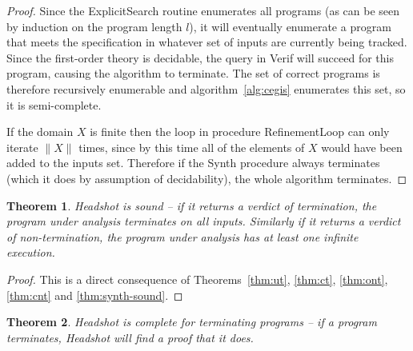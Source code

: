 \documentclass[preprint]{sigplanconf}
\newtheorem{theorem}{Theorem}
\theoremstyle{definition}
\begin{document}
\begin{proof}
 Since the {\sc ExplicitSearch} routine enumerates all programs (as can be seen by induction on
 the program length $l$), it will eventually enumerate a program that meets the specification
 in whatever set of inputs are currently being tracked.  Since the first-order theory is
 decidable, the query in {\sc Verif} will succeed for this program, causing the algorithm to terminate.
 The set of correct programs is therefore recursively enumerable and algorithm~\ref{alg:cegis}
 enumerates this set, so it is semi-complete.

 If the domain $X$ is finite then the loop in procedure {\sc RefinementLoop} can only
 iterate $\| X \|$ times, since by this time all of the elements of $X$ would have been
 added to the inputs set.  Therefore if the {\sc Synth} procedure always terminates (which it does
 by assumption of decidability), the whole algorithm terminates.
\end{proof}


\begin{theorem}
\label{thm:sound}
 {\sc Headshot} is sound -- if it returns a verdict of termination, the program under
 analysis terminates on all inputs.  Similarly if it returns a verdict of non-termination,
 the program under analysis has at least one infinite execution.
\end{theorem}

\begin{proof}
 This is a direct consequence of Theorems~\ref{thm:ut}, \ref{thm:ct}, \ref{thm:ont}, \ref{thm:cnt} and \ref{thm:synth-sound}.
\end{proof}

\begin{theorem}
\label{thm:complete-termination}
 {\sc Headshot} is complete for terminating programs -- if a program terminates, {\sc Headshot} will find a proof that it does.
\end{theorem}
\end{document}
